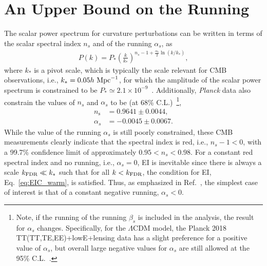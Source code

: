 \documentclass[a4paper,11pt]{article}
\begin{document}
\section{An Upper Bound on the Running}
\label{upper}

The scalar power spectrum for curvature perturbations can be written
in terms of the scalar spectral index $n_s$ and of the running
$\alpha_s$, as
%
\begin{eqnarray}    P(k)=P_*\left(\frac{k}{k_*}\right)^{n_s-1+\frac{\alpha_s}{2}
    \ln(k/k_*)},
\end{eqnarray}
%
where $k_*$ is a pivot scale, which is typically the scale relevant
for CMB observations, i.e., $k_*=0.05h~\rm{Mpc}^{-1}$, for which the
amplitude of the scalar power spectrum is constrained to be $P_*\simeq
2.1 \times 10^{-9}$~\cite{Planck:2018vyg}. Additionally,
\textit{Planck} data also constrain the values of $n_s$ and $\alpha_s$
to be (at 68\% C.L.)~\cite{Planck:2018jri}\footnote{ Note, if the
running of the running $\beta_s$ is included in the analysis, the
result for $\alpha_s$ changes. Specifically, for the $\Lambda$CDM
model, the Planck 2018 TT(TT,TE,EE)+lowE+lensing  data has a slight
preference for a positive value of $\alpha_s$, but overall large
negative values for $\alpha_s$ are still allowed at the 95\%
C.L.~\cite{Planck:2018jri}.},
%
     \begin{align}
n_{\mathrm{s}} & =0.9641 \pm 0.0044, \\ \alpha_s & =-0.0045 \pm
0.0067. \label{eq:Planck_alphaS}
     \end{align}
%
While the value of the running $\alpha_s$ is still poorly constrained,
these CMB measurements clearly indicate that the spectral index is
red, i.e., $n_s-1<0$, with a 99.7\% confidence limit of approximately
$0.95<n_s<0.98$. {}For a constant red spectral index and no running,
i.e., $\alpha_s=0$, EI is inevitable since there is always a scale
$k_{\rm{FDR}}\ll k_*$ such that for all $k<k_{\rm{FDR}}$, the
condition for EI, Eq.~\eqref{eq:EIC_warm}, is satisfied.  Thus, as
emphasized in Ref.~\cite{Kinney:2014jya}, the simplest case of
interest is that of a constant negative running, $\alpha_s<0$.
\end{document}
